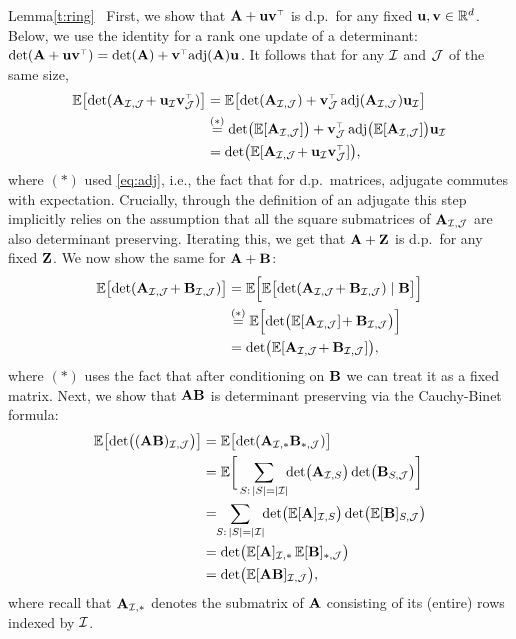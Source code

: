 \begin{proofof}{Lemma}{\ref{t:ring}} \
 First, we show that $\A+\u\v^\top$ is d.p.~for any fixed
 $\mathbf u,\mathbf v\in\mathbb R^d$. Below, we use the identity for a rank one
 update of a determinant:
 $\det(\A+\u\v^\top)=\det(\A)+\v^\top\!\adj(\A)\u$. It follows that
 for any $\mathcal I$ and $\mathcal{J}$ of the same size,
  \begin{align*}
\E\big[\!\det(\A_{\Ic,\Jc}\!+\u_{\Ic}\v_{\Jc}^\top)\big] &=
    \E\big[\!\det(\A_{\Ic,\Jc}) +
    \v_{\Jc}^\top\adj(\A_{\Ic,\Jc}) \u_{\Ic}\big]\\
    &\overset{(*)}{=}\det\!\big(\E[\A_{\Ic,\Jc}]\big) +
      \v_{\Jc}^\top\adj\!\big(\E[\A_{\Ic,\Jc}]\big) \u_{\Ic}\\
    &=\det\!\big(\E[\A_{\Ic,\Jc} \!+ \u_{\Ic}\v_{\Jc}^\top]\big),
  \end{align*}
  where $(*)$ used \eqref{eq:adj}, i.e., the fact that for d.p.~matrices, adjugate commutes
  with expectation. Crucially, through the definition of an adjugate
  this step implicitly relies on the assumption that all the square
  submatrices of $\mathbf A_{\mathcal I,\mathcal{J}}$ are also  determinant preserving.
  Iterating this, we get that $\mathbf A+\mathbf Z$ is d.p.~for any fixed
  $\mathbf Z$. We now show the same for $\mathbf A+\mathbf B$:
  \begin{align*}
\E\big[\!\det(\A_{\Ic,\Jc}\!+\B_{\Ic,\Jc})\big]
    &=
      \E\Big[\E\big[\!\det(\A_{\Ic,\Jc}\!+\B_{\Ic,\Jc})\mid\B\big]\Big]\\
    &\overset{(*)}{=}\E\Big[\!\det\!\big(\E[\A_{\Ic,\Jc}]\!+\B_{\Ic,\Jc}\big)\Big]\\
      &= \det\!\big(\E[\A_{\Ic,\Jc}\!+\B_{\Ic,\Jc}]\big),
  \end{align*}
  where $(*)$  uses the fact that after conditioning on $\mathbf B$ we can
  treat it as a fixed matrix. Next, we show that $\mathbf A\mathbf B$ is determinant preserving via the Cauchy-Binet formula:
  \begin{align*}
    \E\big[\!\det\!\big((\A\B)_{\Ic,\Jc}\big)\big]
    &= \E\big[\!\det(\A_{\Ic,*}\B_{*,\Jc})\big]\\
    &=\E\bigg[\sum_{S:\,|S|=|\Ic|}\!\!\det\!\big(\A_{\Ic,S}\big)
      \det\!\big(\B_{S,\Jc}\big)\bigg]\\
&=\!\!\sum_{S:\,|S|=|\Ic|}\!\!\det\!\big(\E[\A]_{\Ic,S}\big)
                                                \det\!\big(\E[\B]_{S,\Jc}\big)\\
    &=\det\!\big(\E[\A]_{\Ic,*}\, \E[\B]_{*,\Jc}\big)\\
      &= \det\!\big(\E[\A\B]_{\Ic,\Jc}\big),
  \end{align*}
  where recall that $\mathbf A_{\mathcal I,*}$ denotes the submatrix of $\mathbf A$
  consisting of its (entire) rows indexed by $\mathcal I$.
  \end{proofof}

